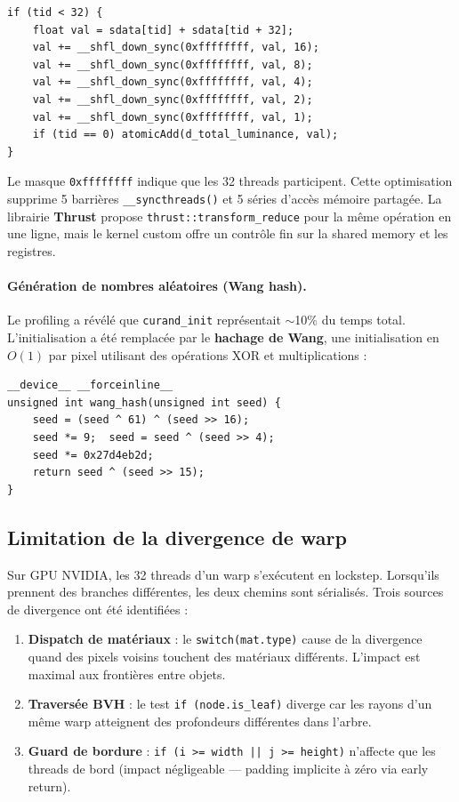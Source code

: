 \documentclass[12pt,a4paper]{article}
\begin{document}
\begin{lstlisting}[caption={R\'{e}duction warp-level avec \_\_shfl\_down\_sync}]
if (tid < 32) {
    float val = sdata[tid] + sdata[tid + 32];
    val += __shfl_down_sync(0xffffffff, val, 16);
    val += __shfl_down_sync(0xffffffff, val, 8);
    val += __shfl_down_sync(0xffffffff, val, 4);
    val += __shfl_down_sync(0xffffffff, val, 2);
    val += __shfl_down_sync(0xffffffff, val, 1);
    if (tid == 0) atomicAdd(d_total_luminance, val);
}
\end{lstlisting}

Le masque \texttt{0xffffffff} indique que les 32 threads participent. Cette optimisation supprime 5 barri\`{e}res \texttt{\_\_syncthreads()} et 5 s\'{e}ries d'acc\`{e}s m\'{e}moire partag\'{e}e. La librairie \textbf{Thrust} propose \texttt{thrust::transform\_reduce} pour la m\^{e}me op\'{e}ration en une ligne, mais le kernel custom offre un contr\^{o}le fin sur la shared memory et les registres.

\paragraph{G\'{e}n\'{e}ration de nombres al\'{e}atoires (Wang hash).}
Le profiling a r\'{e}v\'{e}l\'{e} que \texttt{curand\_init} repr\'{e}sentait $\sim$10\% du temps total. L'initialisation a \'{e}t\'{e} remplac\'{e}e par le \textbf{hachage de Wang}, une initialisation en $O(1)$ par pixel utilisant des op\'{e}rations XOR et multiplications :

\begin{lstlisting}[caption={Initialisation rapide via Wang hash}]
__device__ __forceinline__
unsigned int wang_hash(unsigned int seed) {
    seed = (seed ^ 61) ^ (seed >> 16);
    seed *= 9;  seed = seed ^ (seed >> 4);
    seed *= 0x27d4eb2d;
    return seed ^ (seed >> 15);
}
\end{lstlisting}

\subsection{Limitation de la divergence de warp}

Sur GPU NVIDIA, les 32 threads d'un warp s'ex\'{e}cutent en lockstep. Lorsqu'ils prennent des branches diff\'{e}rentes, les deux chemins sont s\'{e}rialis\'{e}s. Trois sources de divergence ont \'{e}t\'{e} identifi\'{e}es :

\begin{enumerate}
    \item \textbf{Dispatch de mat\'{e}riaux} : le \texttt{switch(mat.type)} cause de la divergence quand des pixels voisins touchent des mat\'{e}riaux diff\'{e}rents. L'impact est maximal aux fronti\`{e}res entre objets.
    \item \textbf{Travers\'{e}e BVH} : le test \texttt{if (node.is\_leaf)} diverge car les rayons d'un m\^{e}me warp atteignent des profondeurs diff\'{e}rentes dans l'arbre.
    \item \textbf{Guard de bordure} : \texttt{if (i >= width || j >= height)} n'affecte que les threads de bord (impact n\'{e}gligeable --- padding implicite \`{a} z\'{e}ro via early return).
\end{enumerate}
\end{document}
